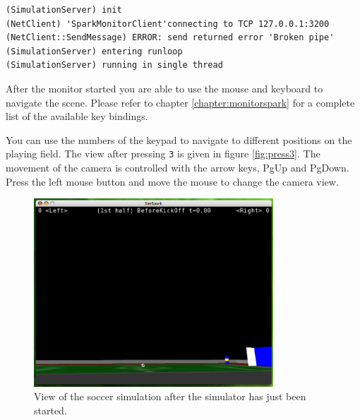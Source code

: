 \begin{itemize}
\begin{verbatim}
(SimulationServer) init
(NetClient) 'SparkMonitorClient'connecting to TCP 127.0.0.1:3200
(NetClient::SendMessage) ERROR: send returned error 'Broken pipe'
(SimulationServer) entering runloop
(SimulationServer) running in single thread
\end{verbatim}

After the monitor started you are able to use the mouse and keyboard
to navigate the scene. Please refer to chapter
\ref{chapter:monitorspark} for a complete list of the available key bindings. 

You can use the numbers of the keypad to navigate to different
positions on the playing field. The view after pressing \texttt{3} is
given in figure \ref{fig:press3}. The movement of the camera is
controlled with the arrow keys, PgUp and PgDown. Press the left mouse
button and move the mouse to change the camera view.


\begin{figure}[htbp]
\begin{center}
\includegraphics[width=0.8\textwidth]{fig/startup}
\caption{View of the soccer simulation after the simulator has just been started.}
\label{fig:startup}
\end{center}
\end{figure}


\end{itemize}
